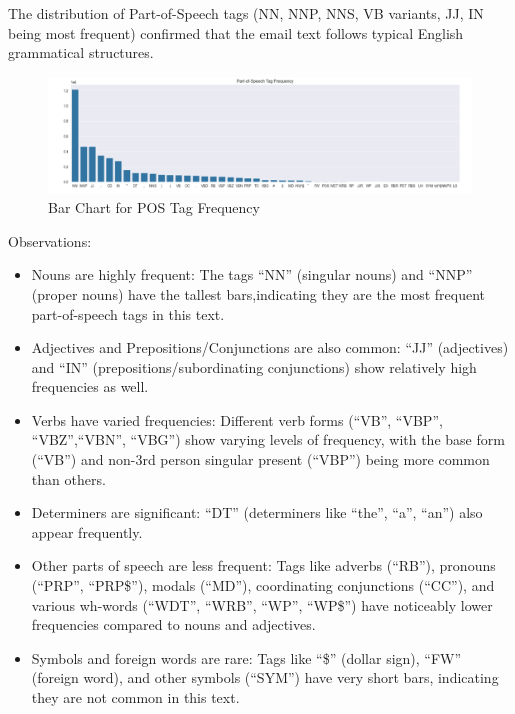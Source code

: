 The distribution of Part-of-Speech tags (NN, NNP, NNS, VB variants, JJ, IN being most frequent) confirmed that the email text follows typical English grammatical structures.

\begin{figure}[H]
    \centering
    \includegraphics[width=\linewidth]{images/pos-tag-frequency}
    \caption{Bar Chart for POS Tag Frequency}
    \label{fig:pos-tag-frequency}
\end{figure}

Observations:
\begin{itemize}
    \item Nouns are highly frequent: The tags ``NN'' (singular nouns) and ``NNP'' (proper nouns) have the tallest bars,indicating they are the most frequent part-of-speech tags in this text.
    \item Adjectives and Prepositions/Conjunctions are also common: ``JJ'' (adjectives) and ``IN'' (prepositions/subordinating conjunctions) show relatively high frequencies as well.
    \item Verbs have varied frequencies: Different verb forms (``VB'', ``VBP'', ``VBZ'',``VBN'', ``VBG'') show varying levels of frequency, with the base form (``VB'') and non-3rd person singular present (``VBP'') being more common than others.
    \item Determiners are significant: ``DT'' (determiners like ``the'', ``a'', ``an'') also appear frequently.
    \item Other parts of speech are less frequent: Tags like adverbs (``RB''), pronouns (``PRP'', ``PRP\$''), modals (``MD''), coordinating conjunctions (``CC''), and various wh-words (``WDT'', ``WRB'', ``WP'', ``WP\$'') have noticeably lower frequencies compared to nouns and adjectives.
    \item Symbols and foreign words are rare: Tags like ``\$'' (dollar sign), ``FW'' (foreign word), and other symbols (``SYM'') have very short bars, indicating they are not common in this text.
\end{itemize}